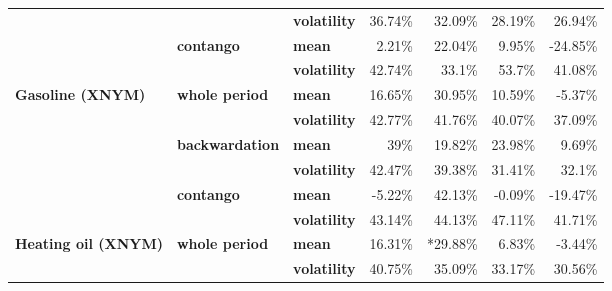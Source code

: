 \documentclass[
  authoryear,
  preprint,
  3p]{elsarticle}
\begin{document}
\begin{longtable}[t]{>{}l>{}l>{}l>{}r>{}r>{}r>{}r}
\textbf{} & \textbf{} & \textbf{volatility} & \textcolor[HTML]{4285f4}{36.74\%} & \textcolor[HTML]{4285f4}{32.09\%} & \textcolor[HTML]{4285f4}{28.19\%} & \textcolor[HTML]{4285f4}{26.94\%}\\
\addlinespace
\textbf{} & \textbf{contango} & \textbf{mean} & \textcolor[HTML]{4285f4}{2.21\%} & \textcolor[HTML]{4285f4}{22.04\%} & \textcolor[HTML]{4285f4}{9.95\%} & \textcolor[HTML]{4285f4}{-24.85\%}\\
\textbf{} & \textbf{} & \textbf{volatility} & \textcolor[HTML]{4285f4}{42.74\%} & \textcolor[HTML]{4285f4}{33.1\%} & \textcolor[HTML]{4285f4}{53.7\%} & \textcolor[HTML]{4285f4}{41.08\%}\\
\textbf{Gasoline (XNYM)} & \textbf{whole period} & \textbf{mean} & \textcolor[HTML]{4285f4}{16.65\%} & \textcolor[HTML]{4285f4}{30.95\%} & \textcolor[HTML]{4285f4}{10.59\%} & \textcolor[HTML]{4285f4}{-5.37\%}\\
\textbf{} & \textbf{} & \textbf{volatility} & \textcolor[HTML]{4285f4}{42.77\%} & \textcolor[HTML]{4285f4}{41.76\%} & \textcolor[HTML]{4285f4}{40.07\%} & \textcolor[HTML]{4285f4}{37.09\%}\\
\textbf{} & \textbf{backwardation} & \textbf{mean} & \textcolor[HTML]{4285f4}{39\%} & \textcolor[HTML]{4285f4}{19.82\%} & \textcolor[HTML]{4285f4}{23.98\%} & \textcolor[HTML]{4285f4}{9.69\%}\\
\addlinespace
\textbf{} & \textbf{} & \textbf{volatility} & \textcolor[HTML]{4285f4}{42.47\%} & \textcolor[HTML]{4285f4}{39.38\%} & \textcolor[HTML]{4285f4}{31.41\%} & \textcolor[HTML]{4285f4}{32.1\%}\\
\textbf{} & \textbf{contango} & \textbf{mean} & \textcolor[HTML]{4285f4}{-5.22\%} & \textcolor[HTML]{4285f4}{42.13\%} & \textcolor[HTML]{4285f4}{-0.09\%} & \textcolor[HTML]{4285f4}{-19.47\%}\\
\textbf{} & \textbf{} & \textbf{volatility} & \textcolor[HTML]{4285f4}{43.14\%} & \textcolor[HTML]{4285f4}{44.13\%} & \textcolor[HTML]{4285f4}{47.11\%} & \textcolor[HTML]{4285f4}{41.71\%}\\
\textbf{Heating oil (XNYM)} & \textbf{whole period} & \textbf{mean} & \textcolor[HTML]{4285f4}{16.31\%} & \textcolor[HTML]{4285f4}{*29.88\%} & \textcolor[HTML]{4285f4}{6.83\%} & \textcolor[HTML]{4285f4}{-3.44\%}\\
\textbf{} & \textbf{} & \textbf{volatility} & \textcolor[HTML]{4285f4}{40.75\%} & \textcolor[HTML]{4285f4}{35.09\%} & \textcolor[HTML]{4285f4}{33.17\%} & \textcolor[HTML]{4285f4}{30.56\%}\\

\end{longtable}
\end{document}
